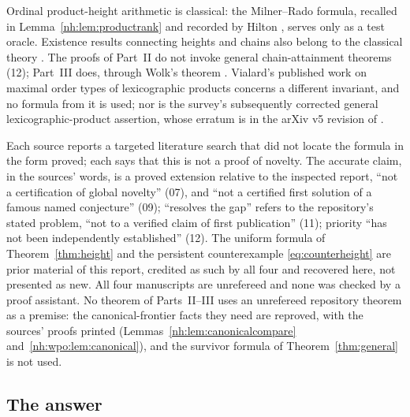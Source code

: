 \documentclass[11pt,a4paper]{article}
\theoremstyle{definition}
\theoremstyle{remark}
\begin{document}
Ordinal product-height arithmetic is classical: the Milner--Rado formula,
recalled in Lemma~\ref{nh:lem:productrank} and recorded by Hilton
\cite[Theorem~2.20]{Hilton2016}, serves only as a test oracle. Existence
results connecting heights and chains also belong to the classical theory
\cite{Schmidt1981,DSS2020}. The proofs of Part~II do not invoke general
chain-attainment theorems (12); Part~III does, through Wolk's theorem
\cite{Wolk1967,MMS2012}. Vialard's published work on maximal order types of
lexicographic products \cite{Vialard2025} concerns a different invariant, and
no formula from it is used; nor is the survey's subsequently corrected
general lexicographic-product assertion, whose erratum is in the arXiv v5
revision of \cite{DSS2020}.

Each source reports a targeted literature search that did not locate the
formula in the form proved; each says that this is not a proof of novelty.
The accurate claim, in the sources' words, is a proved extension relative to
the inspected report, ``not a certification of global novelty'' (07), and
``not a certified first solution of a famous named conjecture'' (09);
``resolves the gap'' refers to the repository's stated problem, ``not to a
verified claim of first publication'' (11); priority ``has not been
independently established'' (12). The uniform formula of
Theorem~\ref{thm:height} and the persistent counterexample
\eqref{eq:counterheight} are prior material of this report, credited as such
by all four and recovered here, not presented as new. All four manuscripts
are unrefereed and none was checked by a proof assistant. No theorem of
Parts~II--III uses an unrefereed repository theorem as a premise: the
canonical-frontier facts they need are reproved, with the sources' proofs
printed (Lemmas~\ref{nh:lem:canonicalcompare} and~\ref{nh:wpo:lem:canonical}),
and the survivor formula of
Theorem~\ref{thm:general} is not used.

\subsection{The answer}\label{nh:sec:answer}
\end{document}
